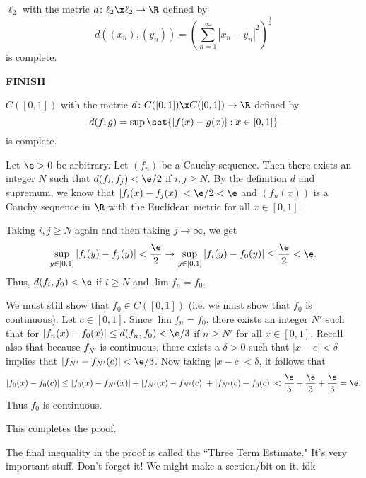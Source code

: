 \documentclass[class=article, crop=false]{standalone}
\begin{document}
\begin{fact}
    $\ell_2$ with the metric $d \colon \ell_2 \x \ell_2 \to \R$ defined by
        \[
            d((x_n),(y_n)) = \left( \sum_{n=1}^{\infty} |x_n-y_n|^2 \right)^{\frac{1}{2}}
        \]
    is complete.
\end{fact}

\begin{pf}
    \textbf{FINISH}
\end{pf}



\begin{fact}
    $C([0,1])$ with the metric $d \colon C([0,1]) \x C([0,1]) \to \R$ defined by
        \[
            d(f,g) = \sup \set{|f(x)-g(x)| : x \in [0,1]}
        \]
    is complete.
\end{fact}
\begin{pf}
    Let $\e > 0$ be arbitrary. Let $(f_n)$ be a Cauchy sequence. Then there exists an integer $N$ such that $d(f_i,f_j) < \e/2$ if $i,j \geq N$. By the definition $d$ and supremum, we know that $|f_i(x)-f_j(x)| < \e/2 < \e$ and $(f_n(x))$ is a Cauchy sequence in $\R$ with the Euclidean metric for all $x \in [0,1]$.

    Taking $i,j \geq N$ again and then taking $j \to \infty$, we get
        \[
            \sup_{y \in [0,1]} |f_i(y)-f_j(y)| < \frac{\e}{2} \to \sup_{y \in [0,1]}|f_i(y)-f_0(y)| \leq \frac{\e}{2} < \e.
        \]
    Thus, $d(f_i,f_0) < \e$ if $i \geq N$ and $\lim f_n =f_0$.

    We must still show that $f_0 \in C([0,1])$ (i.e. we must show that $f_0$ is continuous). Let $c \in [0,1]$. Since $\lim f_n = f_0$, there exists an integer $N'$ such that for $|f_n(x)-f_0(x)| \leq d(f_n,f_0) < \e/3$ if $n \geq N'$ for all $x \in [0,1]$. Recall also that because $f_{N'}$ is continuous, there exists a $\delta > 0$ such that $|x-c| < \delta$
    implies that $|f_{N'}-f_{N'}(c)| < \e/3$. Now taking $|x-c| < \delta$, it follows that
        \[
            |f_0(x)-f_0(c)| \leq |f_0(x) - f_{N'}(x)| + |f_{N'}(x)-f_{N'}(c)| + |f_{N'}(c)-f_0(c)| < \frac{\e}{3}+\frac{\e}{3}+\frac{\e}{3} = \e.
        \]
    Thus $f_0$ is continuous.

    This completes the proof.
\end{pf}
\begin{rem}
    The final inequality in the proof is called the ``Three Term Estimate." It's very important stuff. Don't forget it! We might make a section/bit on it. idk
\end{rem}
\end{document}
